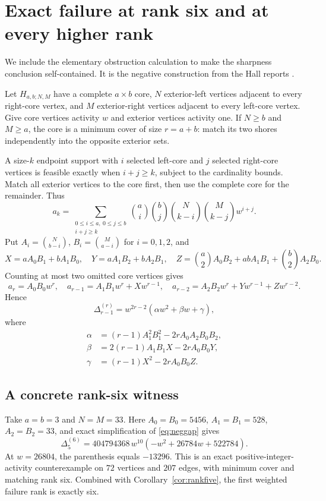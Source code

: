 \section{Exact failure at rank six and at every higher rank}\label{sec:negative}
We include the elementary obstruction calculation to make the sharpness conclusion self-contained. It is the negative construction from the Hall reports \cite{Hall,OldHall}.

Let $H_{a,b;N,M}$ have a complete $a\times b$ core, $N$ exterior-left vertices adjacent to every right-core vertex, and $M$ exterior-right vertices adjacent to every left-core vertex. Give core vertices activity $w$ and exterior vertices activity one. If $N\ge b$ and $M\ge a$, the core is a minimum cover of size $r=a+b$: match its two shores independently into the opposite exterior sets.

A size-$k$ endpoint support with $i$ selected left-core and $j$ selected right-core vertices is feasible exactly when $i+j\ge k$, subject to the cardinality bounds. Match all exterior vertices to the core first, then use the complete core for the remainder. Thus
\begin{equation}\label{eq:Hallcount}
 a_k=\sum_{\substack{0\le i\le a,\ 0\le j\le b\\i+j\ge k}}
 \binom ai\binom bj\binom N{k-i}\binom M{k-j}w^{i+j}.
\end{equation}
Put $A_i=\binom N{b-i}$, $B_i=\binom M{a-i}$ for $i=0,1,2$, and
\[
 X=aA_0B_1+bA_1B_0,\quad Y=aA_1B_2+bA_2B_1,
 \quad Z=\binom a2A_0B_2+abA_1B_1+\binom b2A_2B_0.
\]
Counting at most two omitted core vertices gives
\[
 a_r=A_0B_0w^r,\quad
 a_{r-1}=A_1B_1w^r+Xw^{r-1},\quad
 a_{r-2}=A_2B_2w^r+Yw^{r-1}+Zw^{r-2}.
\]
Hence
\begin{equation}\label{eq:neggap}
 \Delta_{r-1}^{(r)}=w^{2r-2}(\alpha w^2+\beta w+\gamma),
\end{equation}
where
\begin{align*}
 \alpha&=(r-1)A_1^2B_1^2-2rA_0A_2B_0B_2,\\
 \beta&=2(r-1)A_1B_1X-2rA_0B_0Y,\\
 \gamma&=(r-1)X^2-2rA_0B_0Z.
\end{align*}

\subsection{A concrete rank-six witness}
Take $a=b=3$ and $N=M=33$. Here $A_0=B_0=5456$, $A_1=B_1=528$, $A_2=B_2=33$, and exact simplification of \eqref{eq:neggap} gives
\[
 \Delta_5^{(6)}=404794368\,w^{10}(-w^2+26784w+522784).
\]
At $w=26804$, the parenthesis equals $-13296$. This is an exact positive-integer-activity counterexample on $72$ vertices and $207$ edges, with minimum cover and matching rank six. Combined with Corollary~\ref{cor:rankfive}, the first weighted failure rank is exactly six.

